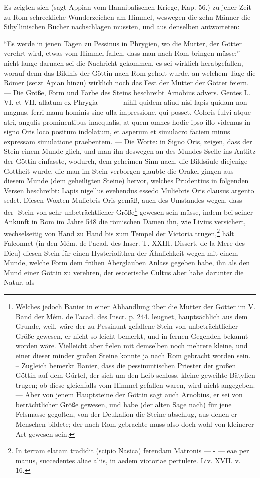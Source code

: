 \documentclass[a4paper, 11pt, oneside, polutonikogreek, german]{article}
\begin{document}
Es zeigten sich (sagt Appian vom Hannibalischen Kriege, Kap. 56.) zu jener Zeit zu Rom schreckliche Wunderzeichen am Himmel, weswegen die zehn Männer die Sibyllinischen Bücher nachschlagen mussten, und aus denselben antworteten:

"`Es werde in jenen Tagen zu Pessinus in Phrygien, wo die Mutter, der Götter verehrt wird, etwas vom Himmel fallen, dass man nach Rom bringen müsse;"' nicht lange darnach sei die Nachricht gekommen, es sei wirklich herabgefallen, worauf denn das Bildnis der Göttin nach Rom geholt wurde, an welchem Tage die Römer (setzt Apian hinzu) wirklich noch das Fest der Mutter der Götter feiern. --- Die Größe, Form und Farbe des Steins beschreibt Arnobius advers. Gentes L. VI. et VII. allatum ex Phrygia --- - --- nihil quidem aliud nisi lapis quidam non magnus, ferri manu hominis sine ulla impressione, qui posset, Coloris fulvi atque atri, angulis prominentibus inaequalis, at quem omnes hodie ipso illo videmus in signo Oris loco positum indolatum, et asperum et simulacro faciem minus expressam simulatione praebentem. --- Die Worte: in Signo Oris, zeigen, dass der Stein einem Munde glich, und man ihn deswegen an des Mundes Sselle ins Antlitz der Göttin einfasste, wodurch, dem geheimen Sinn nach, die Bildsäule diejenige Gottheit wurde, die man im Stein verborgen glaubte die Orakel gingen aus diesem Munde (dem geheiligten Steine) hervor, welches Prudentius in folgenden Versen beschreibt: Lapis nigellus evehendus essedo Muliebris Oris clausus argento sedet. Diesen Woxten Muliebris Oris gemäß, auch des Umstandes wegen, dass der- Stein von sehr unbeträchtlicher Größe\footnote{Welches jedoch Banier in einer Abhandlung über die Mutter der Götter im V. Band der Mém. de l'acad. des Inscr. p. 244. leugnet, hauptsächlich aus dem Grunde, weil, wäre der zu Pessinunt gefallene Stein von unbeträchtlicher Größe gewesen, er nicht so leicht bemerkt, und in fernen Gegenden bekannt worden wäre. Vielleicht aber fielen mit demselben noch mehrere kleine, und einer dieser minder großen Steine konnte ja nach Rom gebracht worden sein. -- Zugleich bemerkt Banier, dass die pessinuntischen Priester der großen Göttin auf dem Gürtel, der sich um den Leib schloss, kleine geweihte Bätylien trugen; ob diese gleichfalls vom Himmel gefallen waren, wird nicht angegeben. --- Aber von jenem Hauptsteine der Göttin sagt auch Arnobius, er sei von beträchtlicher Größe gewesen, und habe (der alten Sage nach) für jene Felsmasse gegolten, von der Deukalion die Steine abschlug, aus denen er Menschen bildete; der nach Rom gebrachte muss also doch wohl von kleinerer Art gewesen sein.} gewesen sein müsse, indem bei seiner Ankunft in Rom im Jahre 548 die römischen Damen ihn, wie Livius versichert, wechselseitig von Hand zu Hand bis zum Tempel der Victoria trugen,\footnote{In terram elatam tradidit (scipio Nasica) ferendam Matronis --- - --- eae per manus, succedentes aliae aliis, in aedem viotoriae pertulere. Liv. XVII. v. 16.} hält Falconnet (in den Mém. de l'acad. des Inscr. T. XXIII. Dissert. de la Mere des Dieu) diesen Stein für einen Hysteriolithen der Ähnlichkeit wegen mit einem Munde, welche Form dem frühen Aberglauben Anlass gegeben habe, ihn als den Mund einer Göttin zu verehren, der esoterische Cultus aber habe darunter die Natur, als 
\end{document}
